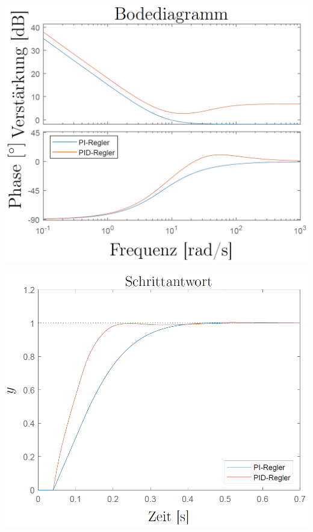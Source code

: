 \begin{minipage}[c]{0.4\columnwidth}
    \includegraphics[width=\columnwidth]{images/gleichstromantrieb_pid-regler_bodediagramm.png}
\end{minipage}
\hfill
\begin{minipage}[c]{0.4\columnwidth}
    \includegraphics[width=\columnwidth]{images/gleichstromantrieb_pid-regler_step_response.png}
\end{minipage}

